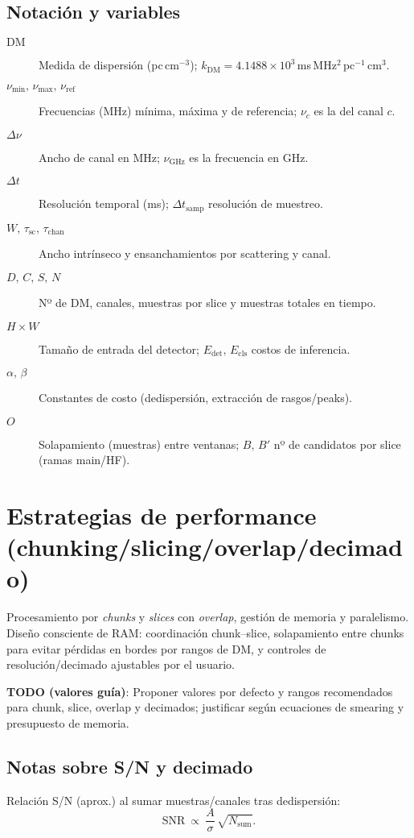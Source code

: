 \subsection*{Notación y variables}
\begin{description}
  \item[$\mathrm{DM}$] Medida de dispersión (pc\,cm$^{-3}$); $k_{\mathrm{DM}}=4.1488\times10^3$\,ms\,MHz$^{2}$\,pc$^{-1}$\,cm$^{3}$.
  \item[$\nu_{\min},\,\nu_{\max},\,\nu_{\mathrm{ref}}$] Frecuencias (MHz) mínima, máxima y de referencia; $\nu_c$ es la del canal $c$.
  \item[$\Delta\nu$] Ancho de canal en MHz; $\nu_{\mathrm{GHz}}$ es la frecuencia en GHz.
  \item[$\Delta t$] Resolución temporal (ms); $\Delta t_{\mathrm{samp}}$ resolución de muestreo.
  \item[$W,\,\tau_{\mathrm{sc}},\,\tau_{\mathrm{chan}}$] Ancho intrínseco y ensanchamientos por scattering y canal.
  \item[$D,\,C,\,S,\,N$] Nº de DM, canales, muestras por slice y muestras totales en tiempo.
  \item[$H\times W$] Tamaño de entrada del detector; $E_{\mathrm{det}},\,E_{\mathrm{cls}}$ costos de inferencia.
  \item[$\alpha,\,\beta$] Constantes de costo (dedispersión, extracción de rasgos/peaks).
  \item[$O$] Solapamiento (muestras) entre ventanas; $B,\,B'$ nº de candidatos por slice (ramas main/HF).
\end{description}

\section{Estrategias de performance (chunking/slicing/overlap/decimado)}
Procesamiento por \textit{chunks} y \textit{slices} con \textit{overlap}, gestión de memoria y paralelismo. Diseño consciente de RAM: coordinación chunk--slice, solapamiento entre chunks para evitar pérdidas en bordes por rangos de DM, y controles de resolución/decimado ajustables por el usuario.

\textbf{TODO (valores guía)}: Proponer valores por defecto y rangos recomendados para chunk, slice, overlap y decimados; justificar según ecuaciones de smearing y presupuesto de memoria.

\subsection*{Notas sobre S/N y decimado}
Relación S/N (aprox.) al sumar muestras/canales tras dedispersión:
\begin{equation}\label{eq:snr_scaling}
\mathrm{SNR}\ \propto\ \frac{A}{\sigma}\,\sqrt{N_{\mathrm{sum}}}.
\end{equation}

